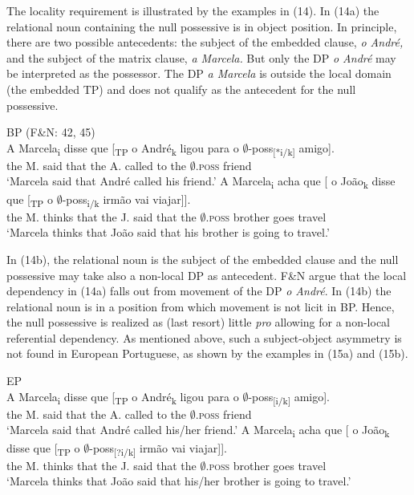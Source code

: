 \documentclass[output=paper]{langsci/langscibook}
\begin{document}
The locality requirement is illustrated by the examples in (14). In (14a) the relational noun containing the null possessive is in object position. In principle, there are two possible antecedents: the subject of the embedded clause, \textit{o André,} and the subject of the matrix clause, \textit{a Marcela.} But only the DP \textit{o André} may be interpreted as the possessor. The DP \textit{a Marcela} is outside the local domain (the embedded TP) and does not qualify as the antecedent for the null possessive. 

\ea%
    BP (F\&N: 42, 45)\label{ex:wein:14}\\
    \ea
    \gll A Marcela\textsubscript{i} disse que [\textsubscript{TP} o André\textsubscript{k} ligou para o $\emptyset$-poss\textsubscript{[}\textsubscript{*i/k]} amigo].\\
         the M. said that {} the A. called to the $\emptyset$\textsc{.poss} friend\\
    \glt ‘Marcela said that André called his friend.’
    \ex  
    \gll A Marcela\textsubscript{i} acha que [ o João\textsubscript{k} disse que [\textsubscript{TP} o $\emptyset$-poss\textsubscript{i/k} irmão vai viajar]].\\
         the M. thinks that {} the J. said that {} the $\emptyset$\textsc{.poss} brother goes travel\\
    \glt ‘Marcela thinks that João said that his brother is going to travel.’
    \z
\z

In (14b), the relational noun is the subject of the embedded clause and the null possessive may take also a non-local DP as antecedent. F\&N argue that the local dependency in (14a) falls out from movement of the DP \textit{o André}. In (14b) the relational noun is in a position from which movement is not licit in BP. Hence, the null possessive is realized as (last resort) little \textit{pro} allowing for a non-local referential dependency. As mentioned above, such a subject-object asymmetry is not found in European Portuguese, as shown by the examples in (15a) and (15b).

\ea%
    EP\label{ex:wein:15}\\
    \ea
    \gll A Marcela\textsubscript{i} disse que [\textsubscript{TP} o André\textsubscript{k} ligou para o $\emptyset$-poss\textsubscript{[}\textsubscript{i/k]} amigo].\\
         the M. said that {} the A. called to the $\emptyset$\textsc{.poss} friend\\
    \glt ‘Marcela said that André called his/her friend.’
    \ex  
    \gll A Marcela\textsubscript{i} acha que [ o João\textsubscript{k} disse que [\textsubscript{TP} o $\emptyset$-poss\textsubscript{[}\textsubscript{?i/k]} irmão vai viajar]].\\
         the M. thinks that {} the J. said that {} the $\emptyset$\textsc{.poss} brother goes travel\\
    \glt ‘Marcela thinks that João said that his/her brother is going to travel.’
    \z
\z
\end{document}
